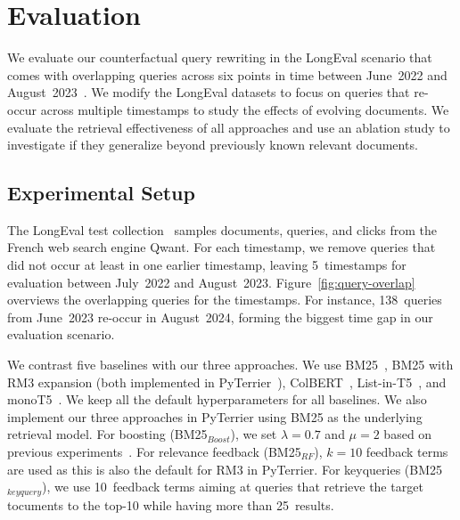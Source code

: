 \section{Evaluation}

\enlargethispage*{2\baselineskip}
We evaluate our counterfactual query rewriting in the LongEval scenario that comes with overlapping queries across six points in time between June~2022 and August~2023~\cite{alkhalifa:2023,alkhalifa:2024,galuscakova:2023}. We modify the LongEval datasets to focus on queries that re-occur across multiple timestamps to study the effects of evolving documents. We evaluate the retrieval effectiveness of all approaches and use an ablation study to investigate if they generalize beyond previously known relevant documents.

\subsection{Experimental Setup}
The LongEval test collection~\cite{galuscakova:2023} samples documents, queries, and clicks from the French web search engine Qwant. For each timestamp, we remove queries that did not occur at least in one earlier timestamp, leaving 5~time\-stamps for evaluation between July~2022 and August~2023. %
Figure~\ref{fig:query-overlap} overviews the overlapping queries for the timestamps. For instance, 138~queries from June~2023 re-occur in August~2024, forming the biggest time gap in our evaluation scenario.

We contrast five baselines with our three approaches. We use BM25~\cite{robertson:1994}, BM25 with RM3 expansion (both implemented in PyTerrier~\cite{macdonald:2020}), ColBERT~\cite{khattab:2020}, List-in-T5~\cite{tamber:2023}, and monoT5~\cite{nogueira:2020}. We keep all the default hyperparameters for all baselines. We also implement our three approaches in PyTerrier using BM25 as the underlying retrieval model. For boosting (BM25$_{Boost}$), we set $\lambda=0.7$ and $\mu=2$ based on previous experiments~\cite{keller:2024b}. For relevance feedback (BM25$_{RF}$), $k=10$ feedback terms are used as this is also the default for RM3 in PyTerrier. For keyqueries (BM25$_{keyquery}$), we use 10~feedback terms aiming at queries that retrieve the target tocuments to the top-10 while having more than 25~results.



